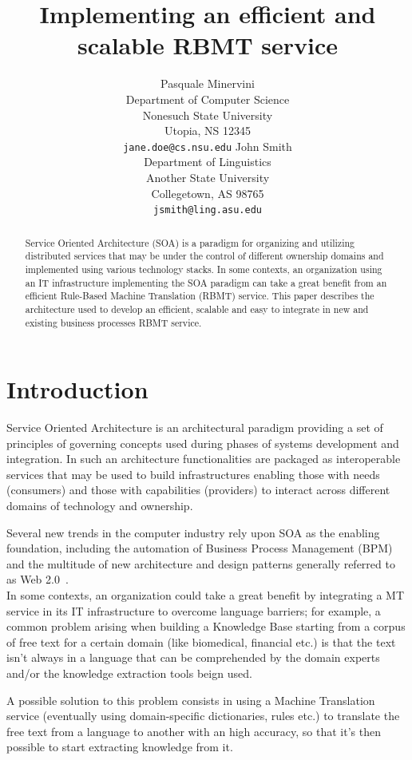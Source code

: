 \documentclass[11pt]{article}
\title{Implementing an efficient and scalable RBMT service}
\author{Pasquale Minervini\\
  Department of Computer Science \\
  Nonesuch State University \\
  Utopia, NS 12345 \\
  {\tt jane.doe@cs.nsu.edu} \And
  John Smith \\
  Department of Linguistics \\
  Another State University \\
  Collegetown, AS 98765 \\  
  {\tt jsmith@ling.asu.edu}}
\date{}
\begin{document}
\maketitle

\begin{abstract}
Service Oriented Architecture (SOA) is a paradigm for organizing and utilizing distributed services that may be under the 
control of different ownership domains and implemented using various technology stacks. In some contexts, an organization
using an IT infrastructure implementing the SOA paradigm can take a great benefit from an efficient Rule-Based Machine 
Translation (RBMT) service. This paper describes the architecture used to develop an efficient, scalable and easy to integrate
in new and existing business processes RBMT service.
\end{abstract}

\section{Introduction}

Service Oriented Architecture is an architectural paradigm providing  a set of principles of governing concepts used during phases 
of systems development and integration. In such an architecture functionalities are packaged as interoperable services that may be 
used to build infrastructures enabling those with needs (consumers) and those with capabilities (providers) to interact across 
different domains of technology and ownership.

Several new trends in the computer industry rely upon SOA as the enabling foundation, including the automation of Business Process 
Management (BPM) and the multitude of new architecture and design patterns generally referred to as Web 2.0~\cite{web20}.\\

In some contexts, an organization could take a great benefit by integrating a MT service in its IT infrastructure to overcome 
language barriers; for example, a common problem arising when building a Knowledge Base starting from a corpus of free text for
a certain domain (like biomedical, financial etc.) is that the text isn't always in a language that can be comprehended by the
domain experts and/or the knowledge extraction tools beign used.

A possible solution to this problem consists in using a Machine
Translation service (eventually using domain-specific dictionaries, rules etc.) to translate the free text from a language to
another with an high accuracy, so that it's then possible to start extracting knowledge from it.\\
\end{document}
